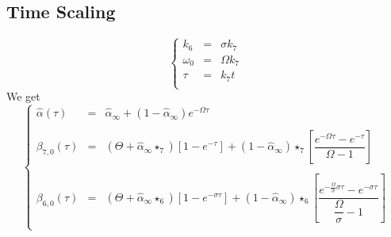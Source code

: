 \documentclass[aps,onecolumn,12pt]{revtex4}
\begin{document}
\subsection{Time Scaling}
\begin{equation}
\left\lbrace
\begin{array}{rcl}
	k_6      & = & \sigma k_7\\
	\omega_0 & = & \Omega k_7\\
	\tau     & = & k_7 t\\
\end{array}
\right.
\end{equation}
We get
\begin{equation}
\left\lbrace
\begin{array}{rcl}
	\hat\alpha(\tau)  & = & \hat\alpha_\infty + \left(1-\hat\alpha_\infty\right) e^{-\Omega \tau}\\
	\\
	\beta_{7,0}(\tau) & = & \left( \Theta + \hat\alpha_\infty \star_7 \right)  \left[1-e^{-\tau}\right]
	+ \left(1-\hat\alpha_\infty\right) \star_7 \left[\dfrac{e^{-\Omega\tau} - e^{-\tau}}{\Omega-1}\right]\\
	\\
	\beta_{6,0}(\tau) & = & \left( \Theta + \hat\alpha_\infty \star_6 \right)  \left[1-e^{-\sigma\tau}\right]
	+ \left(1-\hat\alpha_\infty\right) \star_6 \left[\dfrac{e^{-\frac{\Omega}{\sigma}\sigma\tau} - e^{-\sigma\tau}}{\dfrac{\Omega}{\sigma}-1}\right]\\
\end{array}
\right.
\end{equation}
\end{document}
